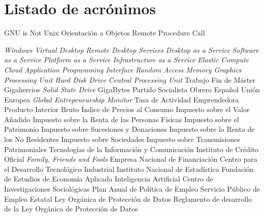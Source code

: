 \chapter{Listado de acrónimos}

{\small
\begin{acronym}[XXXXXXXX]
       {\acs{GNU} is Not Unix}
        {Orientación a Objetos}
       {Remote Procedure Call}
  
       {\textit{Windows Virtual Desktop}}
       {\textit{Remote Desktop Services}}
      {\textit{Desktop as a Service}}
      {\textit{Software as a Service}}
      {\textit{Platform as a Service}}
      {\textit{Infrastructure as a Service}}
       {\textit{Elastic Compute Cloud}}
       {\textit{Application Programming Interface}}
       {\textit{Random Access Memory}}
       {\textit{Graphics Processing Unit}}
       {\textit{Hard Disk Drive}}
       {\textit{Central Processing Unit}}
       {Trabajo Fin de Máster}
       {Gigahercios}
       {\textit{Solid State Drive}}
        {GigaBytes}
      {Partido Socialista Obrero Español}
        {Unión Europea}
       {\textit{Global Entrepeneurship Monitor}}
       {Tasa de Actividad Emprendedora}
       {Producto Interior Bruto}
       {Índice de Precios al Consumo}
       {Impuesto sobre el Valor Añadido}
      {Impuesto sobre la Renta de las Personas Físicas}
        {Impuesto sobre el Patrimonio}
       {Impuesto sobre Sucesiones y Donaciones}
      {Impuesto sobre la Renta de los No Residentes}
        {Impuesto sobre Sociedades}
       {Impuesto sobre Transmisiones Patrimoniales}
       {Tecnologías de la Información y Comunicación}
       {Instituto de Crédito Oficial}
       {\textit{Family, Friends and Fools}}
     {Empresa Nacional de Financiación}
      {Centro para el Desarrollo Tecnológico Industrial}
       {Instituto Nacional de Estadística}
     {Fundación de Estudios de Economía Aplicada}
        {Inteligencia Artificial}
       {Centro de Investigaciones Sociológicas}
      {Plan Anual de Política de Empleo}
      {Servicio Público de Empleo Estatal}
      {Ley Orgánica de Protección de Datos}
     {Reglamento de desarrollo de la Ley Orgánica de Protección de Datos}

\end{acronym}}
